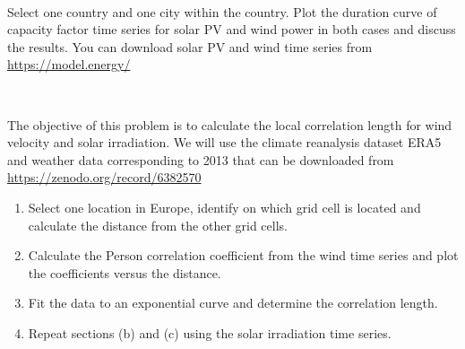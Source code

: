 \documentclass[10pt]{article}
\newenvironment{problem}[2][Problem]{\begin{trivlist}
\item[\hskip \labelsep {\bfseries #1}\hskip \labelsep {\bfseries #2.}]}{\end{trivlist}}
\begin{document}
\

\begin{problem}{1.4 (Optional)}
Select one country and one city within the country. Plot the duration curve of capacity factor time series for solar PV and wind power in both cases and discuss the results. You can download solar PV and wind time series from \url{https://model.energy/}
\end{problem}

\

\begin{problem}{1.5 (Optional)}

The objective of this problem is to calculate the local correlation length for wind velocity and solar irradiation. We will use the climate reanalysis dataset ERA5 and weather data corresponding to 2013 that can be downloaded from \url{https://zenodo.org/record/6382570}

\begin{enumerate}
\item[a)] Select one location in Europe, identify on which grid cell is located and calculate the distance from the other grid cells. 
\item[b)] Calculate the Person correlation coefficient from the wind time series and plot the coefficients versus the distance.
\item[c)] Fit the data to an exponential curve and determine the correlation length.
\item[d)] Repeat sections (b) and (c) using the solar irradiation time series.
\end{enumerate}


\end{problem}

\end{document}
